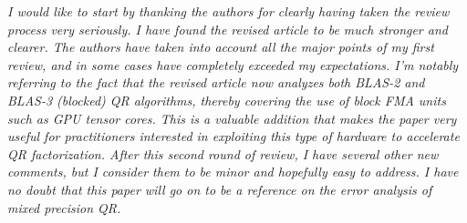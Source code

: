 \documentclass[final,onefignum,onetabnum]{siamart190516}
\begin{document}
{\it I would like to start by thanking the authors for clearly having taken the review process very seriously. I have found the revised article to be much stronger and clearer. The authors have taken into account all the major points of my first review, and in some cases have completely exceeded my expectations. I’m notably referring to the fact that the revised article now analyzes both BLAS-2 and BLAS-3 (blocked) QR algorithms, thereby covering the use of block FMA units such as GPU tensor cores. This is a valuable addition that makes the paper very useful for practitioners interested in exploiting this type of hardware to accelerate QR factorization.
After this second round of review, I have several other new comments, but I consider them to be minor and hopefully easy to address. I have no doubt that this paper will go on to be a reference on the error analysis of mixed precision QR.}
\end{document}
